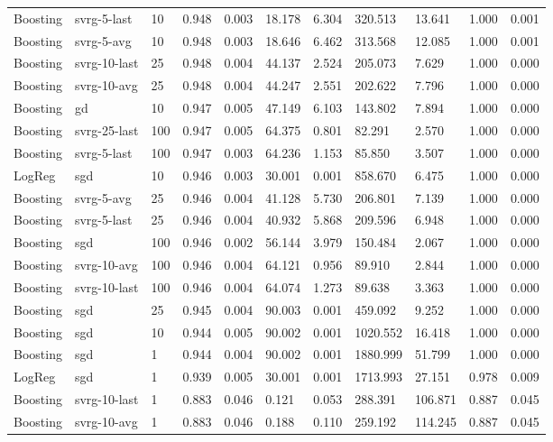 \documentclass[margin={10pt 10pt 10pt 10pt}]{standalone}
\begin{document}
\begin{tabular}{lllllllllll}
    Boosting & svrg-5-last & 10 & 0.948 & 0.003 & 18.178 & 6.304 & 320.513 & 13.641 & 1.000 & 0.001 \\
    Boosting & svrg-5-avg & 10 & 0.948 & 0.003 & 18.646 & 6.462 & 313.568 & 12.085 & 1.000 & 0.001 \\
    Boosting & svrg-10-last & 25 & 0.948 & 0.004 & 44.137 & 2.524 & 205.073 & 7.629 & 1.000 & 0.000 \\
    Boosting & svrg-10-avg & 25 & 0.948 & 0.004 & 44.247 & 2.551 & 202.622 & 7.796 & 1.000 & 0.000 \\
    Boosting & gd & 10 & 0.947 & 0.005 & 47.149 & 6.103 & 143.802 & 7.894 & 1.000 & 0.000 \\
    Boosting & svrg-25-last & 100 & 0.947 & 0.005 & 64.375 & 0.801 & 82.291 & 2.570 & 1.000 & 0.000 \\
    Boosting & svrg-5-last & 100 & 0.947 & 0.003 & 64.236 & 1.153 & 85.850 & 3.507 & 1.000 & 0.000 \\
    LogReg & sgd & 10 & 0.946 & 0.003 & 30.001 & 0.001 & 858.670 & 6.475 & 1.000 & 0.000 \\
    Boosting & svrg-5-avg & 25 & 0.946 & 0.004 & 41.128 & 5.730 & 206.801 & 7.139 & 1.000 & 0.000 \\
    Boosting & svrg-5-last & 25 & 0.946 & 0.004 & 40.932 & 5.868 & 209.596 & 6.948 & 1.000 & 0.000 \\
    Boosting & sgd & 100 & 0.946 & 0.002 & 56.144 & 3.979 & 150.484 & 2.067 & 1.000 & 0.000 \\
    Boosting & svrg-10-avg & 100 & 0.946 & 0.004 & 64.121 & 0.956 & 89.910 & 2.844 & 1.000 & 0.000 \\
    Boosting & svrg-10-last & 100 & 0.946 & 0.004 & 64.074 & 1.273 & 89.638 & 3.363 & 1.000 & 0.000 \\
    Boosting & sgd & 25 & 0.945 & 0.004 & 90.003 & 0.001 & 459.092 & 9.252 & 1.000 & 0.000 \\
    Boosting & sgd & 10 & 0.944 & 0.005 & 90.002 & 0.001 & 1020.552 & 16.418 & 1.000 & 0.000 \\
    Boosting & sgd & 1 & 0.944 & 0.004 & 90.002 & 0.001 & 1880.999 & 51.799 & 1.000 & 0.000 \\
    LogReg & sgd & 1 & 0.939 & 0.005 & 30.001 & 0.001 & 1713.993 & 27.151 & 0.978 & 0.009 \\
    Boosting & svrg-10-last & 1 & 0.883 & 0.046 & 0.121 & 0.053 & 288.391 & 106.871 & 0.887 & 0.045 \\
    Boosting & svrg-10-avg & 1 & 0.883 & 0.046 & 0.188 & 0.110 & 259.192 & 114.245 & 0.887 & 0.045 \\

\end{tabular}
\end{document}

